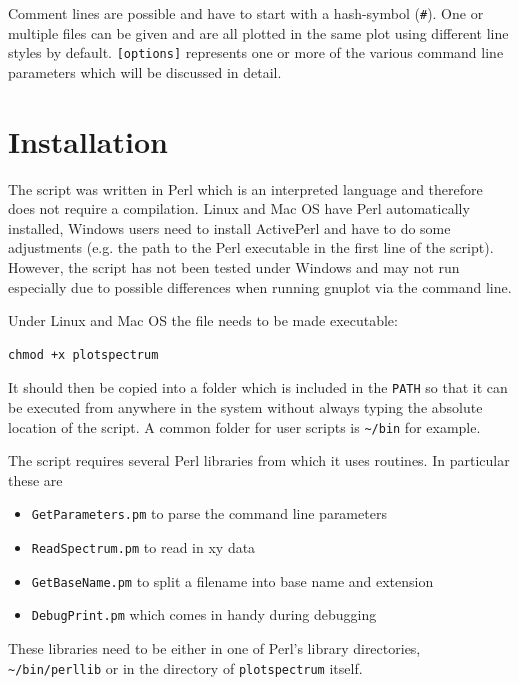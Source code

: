 \documentclass[12pt, a4paper]{article}
\begin{document}
Comment lines are possible and have to start with a hash-symbol (\verb'#'). One or multiple files can be given and are all plotted in the same plot using different line styles by default. \verb'[options]' represents one or more of the various command line parameters which will be discussed in detail.





\section{Installation}

The script was written in Perl which is an interpreted language and therefore does not require a compilation. Linux and Mac OS have Perl automatically installed, Windows users need to install ActivePerl\cite{ActivePerl} and have to do some adjustments (e.g. the path to the Perl executable in the first line of the script). However, the script has not been tested under Windows and may not run especially due to possible differences when running gnuplot via the command line.

Under Linux and Mac OS the file needs to be made executable:
\begin{verbatim}
chmod +x plotspectrum
\end{verbatim}

It should then be copied into a folder which is included in the \verb'PATH' so that it can be executed from anywhere in the system without always typing the absolute location of the script. A common folder for user scripts is \verb'~/bin' for example.

The script requires several Perl libraries from which it uses routines. In particular these are
\begin{itemize}
\item \verb'GetParameters.pm' to parse the command line parameters
\item \verb'ReadSpectrum.pm' to read in xy data
\item \verb'GetBaseName.pm' to split a filename into base name and extension
\item \verb'DebugPrint.pm' which comes in handy during debugging
\end{itemize}

These libraries need to be either in one of Perl's library directories, \verb'~/bin/perllib' or in the directory of \texttt{plotspectrum} itself.
\end{document}
